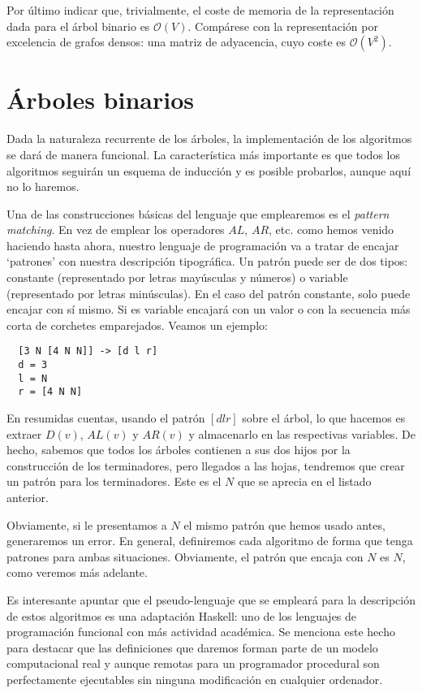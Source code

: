 \documentclass[10pt,spanish,twocolumn]{article}
\begin{document}
Por último indicar que, trivialmente, el coste de memoria de la representación 
dada para el árbol binario es $\mathcal{O}(V)$.  Compárese con la 
representación por excelencia de grafos densos: una matriz de adyacencia, cuyo 
coste es $\mathcal{O}(V^2)$.

\section{Árboles binarios}
Dada la naturaleza recurrente de los árboles, la implementación de los 
algoritmos se dará de manera funcional.  La característica más importante es 
que todos los algoritmos seguirán un esquema de inducción y es posible 
probarlos, aunque aquí no lo haremos.

Una de las construcciones básicas del lenguaje que emplearemos es el 
\emph{pattern matching}.  En vez de emplear los operadores $AL$, $AR$, etc.  
como hemos venido haciendo hasta ahora, nuestro lenguaje de programación va a 
tratar de encajar `patrones' con nuestra descripción tipográfica.  Un patrón 
puede ser de dos tipos: constante (representado por letras mayúsculas y 
números) o variable (representado por letras minúsculas).  En el caso del 
patrón constante, solo puede encajar con sí mismo.  Si es variable encajará con 
un valor o con la secuencia más corta de corchetes emparejados.  Veamos un 
ejemplo:

\begin{lstlisting}
  [3 N [4 N N]] -> [d l r]
  d = 3
  l = N
  r = [4 N N]
\end{lstlisting}

En resumidas cuentas, usando el patrón $[d l r]$ sobre el árbol, lo que hacemos 
es extraer $D(v)$, $AL(v)$ y $AR(v)$ y almacenarlo en las respectivas 
variables.  De hecho, sabemos que todos los árboles contienen a sus dos hijos 
por la construcción de los terminadores, pero llegados a las hojas, tendremos 
que crear un patrón para los terminadores.  Este es el $N$ que se aprecia en el 
listado anterior.

Obviamente, si le presentamos a $N$ el mismo patrón que hemos usado antes, 
generaremos un error.  En general, definiremos cada algoritmo de forma que 
tenga patrones para ambas situaciones.  Obviamente, el patrón que encaja con 
$N$ es $N$, como veremos más adelante.

Es interesante apuntar que el pseudo-lenguaje que se empleará para la 
descripción de estos algoritmos es una adaptación Haskell: uno de los lenguajes 
de programación funcional con más actividad académica.  Se menciona este hecho 
para destacar que las definiciones que daremos forman parte de un modelo 
computacional real y aunque remotas para un programador procedural son 
perfectamente ejecutables sin ninguna modificación en cualquier ordenador.
\end{document}
